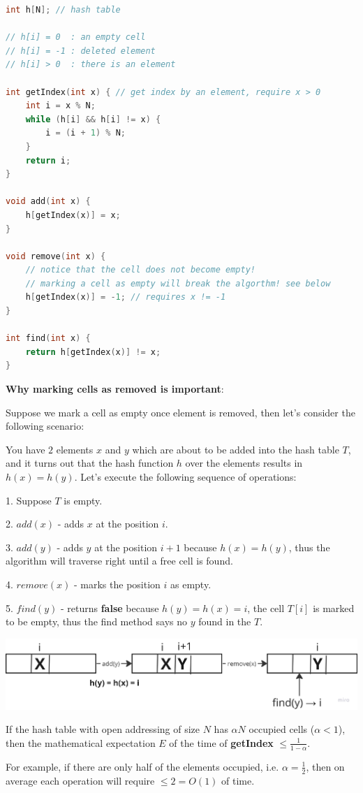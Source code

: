 \begin{lstlisting}[language=C++]
int h[N]; // hash table

// h[i] = 0  : an empty cell
// h[i] = -1 : deleted element
// h[i] > 0  : there is an element

int getIndex(int x) { // get index by an element, require x > 0
    int i = x % N;
    while (h[i] && h[i] != x) {
        i = (i + 1) % N;
    }
    return i;
}

void add(int x) {
    h[getIndex(x)] = x;
}

void remove(int x) {
    // notice that the cell does not become empty!
    // marking a cell as empty will break the algorthm! see below
    h[getIndex(x)] = -1; // requires x != -1
}

int find(int x) {
    return h[getIndex(x)] != x;
}
\end{lstlisting}

\textbf{Why marking cells as removed is important}:

Suppose we mark a cell as empty once element is removed, then let's consider the following scenario:

You have $2$ elements $x$ and $y$ which are about to be added into the hash table $T$, and it turns out that the hash function $h$ over the elements results in $h(x) = h(y)$. Let's execute the following sequence of operations:

1. Suppose $T$ is empty.

2. $add(x)$ - adds $x$ at the position $i$.

3. $add(y)$ - adds $y$ at the position $i+1$ because $h(x) = h(y)$, thus the algorithm will traverse right until a free cell is found.

4. $remove(x)$ - marks the position $i$ as empty.

5. $find(y)$ - returns \textbf{false} because $h(y) = h(x) = i$, the cell $T[i]$ is marked to be empty, thus the find method says no $y$ found in the $T$.


\begin{center}
    \includegraphics[scale=0.15]{./assets/11-hash-table/1.png}
\end{center}


\begin{lemma}
    If the hash table with open addressing of size $N$ has $\alpha N$ occupied cells ($\alpha < 1$), then the mathematical expectation $E$ of the time of \textbf{getIndex} $\leq \frac{1}{1-\alpha}$.

    For example, if there are only half of the elements occupied, i.e. $\alpha = \frac{1}{2}$, then on average each operation will require $\leq 2 = O(1)$ of time.
\end{lemma}

